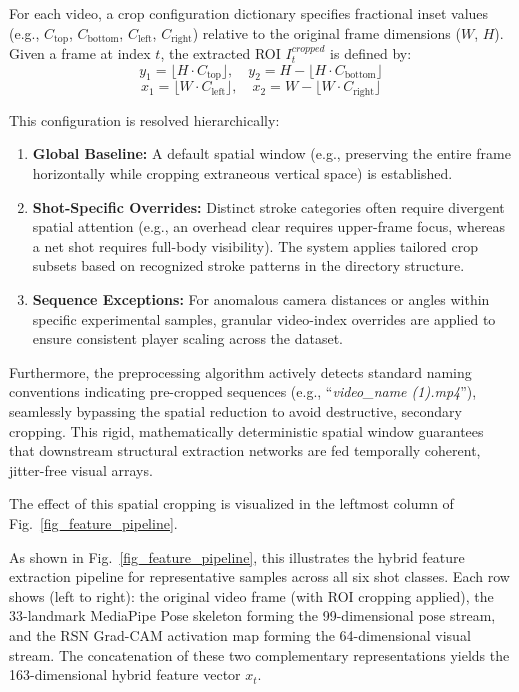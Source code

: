 \documentclass[pdflatex,sn-mathphys-num]{sn-jnl}%
\theoremstyle{thmstyleone}%
\theoremstyle{thmstyletwo}%
\theoremstyle{thmstylethree}%
\begin{document}
For each video, a crop configuration dictionary specifies fractional inset values (e.g., $C_{\text{top}}$, $C_{\text{bottom}}$, $C_{\text{left}}$, $C_{\text{right}}$) relative to the original frame dimensions ($W$, $H$). Given a frame at index $t$, the extracted ROI $I_t^{cropped}$ is defined by:
\begin{equation}
y_1 = \lfloor H \cdot C_{\text{top}} \rfloor, \quad y_2 = H - \lfloor H \cdot C_{\text{bottom}} \rfloor
\end{equation}
\begin{equation}
x_1 = \lfloor W \cdot C_{\text{left}} \rfloor, \quad x_2 = W - \lfloor W \cdot C_{\text{right}} \rfloor
\end{equation}

This configuration is resolved hierarchically:
\begin{enumerate}
    \item \textbf{Global Baseline:} A default spatial window (e.g., preserving the entire frame horizontally while cropping extraneous vertical space) is established.
    \item \textbf{Shot-Specific Overrides:} Distinct stroke categories often require divergent spatial attention (e.g., an overhead clear requires upper-frame focus, whereas a net shot requires full-body visibility). The system applies tailored crop subsets based on recognized stroke patterns in the directory structure.
    \item \textbf{Sequence Exceptions:} For anomalous camera distances or angles within specific experimental samples, granular video-index overrides are applied to ensure consistent player scaling across the dataset.
\end{enumerate}

Furthermore, the preprocessing algorithm actively detects standard naming conventions indicating pre-cropped sequences (e.g., ``\textit{video\_name (1).mp4}''), seamlessly bypassing the spatial reduction to avoid destructive, secondary cropping. This rigid, mathematically deterministic spatial window guarantees that downstream structural extraction networks are fed temporally coherent, jitter-free visual arrays.

The effect of this spatial cropping is visualized in the leftmost column of Fig.~\ref{fig_feature_pipeline}.

As shown in Fig.~\ref{fig_feature_pipeline}, this illustrates the hybrid feature extraction pipeline for representative samples across all six shot classes. Each row shows (left to right): the original video frame (with ROI cropping applied), the 33-landmark MediaPipe Pose skeleton forming the 99-dimensional pose stream, and the RSN Grad-CAM activation map forming the 64-dimensional visual stream. The concatenation of these two complementary representations yields the 163-dimensional hybrid feature vector $x_t$.
\end{document}
